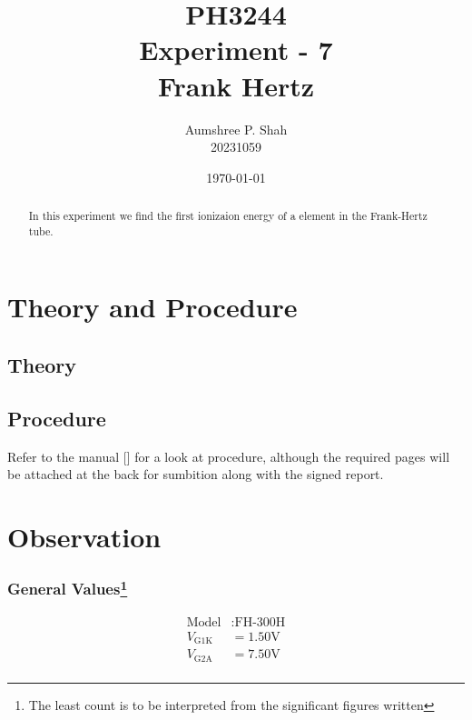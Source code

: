 \documentclass[%
sor,
 jor,
 amsmath,amssymb,
 reprint,
longbibliography,
]{revtex4-2}
\begin{document}
\title{PH3244\\Experiment - 7\\Frank Hertz}
\author{Aumshree P. Shah\\20231059}
\date{\today}
\begin{abstract}
\centering
In this experiment we find the first ionizaion energy of a element in the Frank-Hertz tube.
\end{abstract}
\maketitle
\tableofcontents
\vspace*{\fill}
\pagebreak
\section{Theory and Procedure}
\subsection{Theory}




\subsection{Procedure}Refer to the manual [\cite{ph3244repo}] for a look at procedure, although the required pages will be attached at the back for sumbition along with the signed report.
\section{Observation}
\subsubsection{General Values\footnote{The least count is to be interpreted from the significant figures written}}
\begin{align*}
	\text{Model} &: \text{FH-300H}\\
	V_\text{G1K} &= 1.50 \si{\volt}\\
	V_\text{G2A} &= 7.50 \si{\volt}\\
\end{align*}
\end{document}
